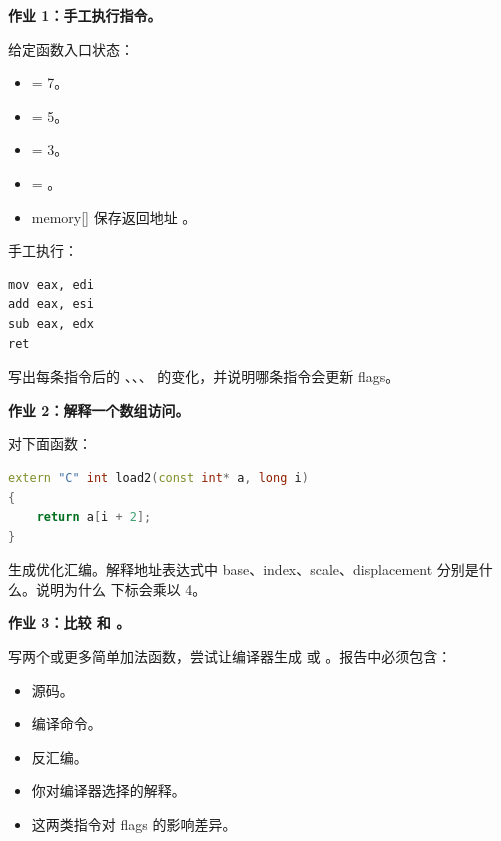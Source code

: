 \begin{exercisebox}
\textbf{作业 1：手工执行指令。}

给定函数入口状态：

\begin{itemize}
  \item {} = 7。
  \item {} = 5。
  \item {} = 3。
  \item {} = 。
  \item memory[] 保存返回地址 。
\end{itemize}

手工执行：

\begin{lstlisting}
mov eax, edi
add eax, esi
sub eax, edx
ret
\end{lstlisting}

写出每条指令后的 、、、 的变化，并说明哪条指令会更新 flags。
\end{exercisebox}

\begin{exercisebox}
\textbf{作业 2：解释一个数组访问。}

对下面函数：

\begin{lstlisting}[language=C++]
extern "C" int load2(const int* a, long i)
{
    return a[i + 2];
}
\end{lstlisting}

生成优化汇编。解释地址表达式中 base、index、scale、displacement 分别是什么。说明为什么  下标会乘以 4。
\end{exercisebox}

\begin{exercisebox}
\textbf{作业 3：比较  和 。}

写两个或更多简单加法函数，尝试让编译器生成  或 。报告中必须包含：

\begin{itemize}
  \item 源码。
  \item 编译命令。
  \item 反汇编。
  \item 你对编译器选择的解释。
  \item 这两类指令对 flags 的影响差异。
\end{itemize}
\end{exercisebox}

